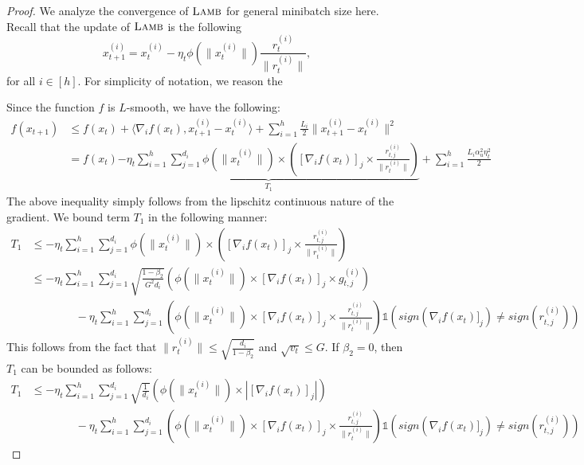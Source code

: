 \begin{proof}
We analyze the convergence of $\textsc{Lamb}$ for general minibatch size here. Recall that the update of $\textsc{Lamb}$  is the following
$$
x_{t+1}^{(i)}  = x_{t}^{(i)} - \eta_t \phi(\|x_t^{(i)}\|) \frac{r_{t}^{(i)}}{\|r_t^{(i)}\|},
$$
for all $i \in [h]$. For simplicity of notation, we reason the 

Since the function $f$ is $L$-smooth, we have the following:
\begin{align}
f(x_{t+1}) &\leq f(x_t) + \langle \nabla_i f(x_t), x_{t+1}^{(i)} - x_{t}^{(i)} \rangle + \sum_{i=1}^h \frac{L_i}{2} \|x_{t+1}^{(i)} - x_t^{(i)}\|^2 \nonumber \\
&= f(x_t) \underbrace{- \eta_t  \sum_{i=1}^h \sum_{j=1}^{d_i} \phi(\|x_t^{(i)}\|)  \times \left( [\nabla_i f(x_t)]_j \times \frac{r_{t,j}^{(i)}}{\|r_{t}^{(i)}\|}  \right)}_{T_1} + \sum_{i=1}^h \frac{L_i \alpha_u^2 \eta_t^2}{2}
\label{eq:lamb-conv-eq1}
\end{align}
The above inequality simply follows from the lipschitz continuous nature of the gradient. We bound term $T_1$ in the following manner:
\begin{align}
T_1  &\leq - \eta_t  \sum_{i=1}^h \sum_{j=1}^{d_i} \phi(\|x_t^{(i)}\|) \times \left( [\nabla_i f(x_t)]_j \times \frac{r_{t,j}^{(i)}}{\|r_{t}^{(i)}\|}  \right) \nonumber \\
&\leq - \eta_t \sum_{i=1}^h \sum_{j=1}^{d_i} \sqrt{\frac{1 - \beta_2}{G^2d_i}} \left( \phi(\|x_t^{(i)}\|)  \times [\nabla_i f(x_t)]_j \times g_{t,j}^{(i)}  \right) \nonumber \\
&\qquad \qquad - \eta_t \sum_{i=1}^h \sum_{j=1}^{d_i} \left(\phi(\|x_t^{(i)}\|)  \times [\nabla_i f(x_t)]_j \times \frac{r_{t,j}^{(i)}}{\|r_{t}^{(i)}\|}  \right)\mathds{1}(sign(\nabla_i f(x_t)]_j) \neq sign(r_{t,j}^{(i)})) 
\label{eq:lamb-conv-eq2}
\end{align}
This follows from the fact that $\|r_{t}^{(i)}\| \leq \sqrt{\frac{d_i}{1 - \beta_2}}$ and $\sqrt{v_t} \leq G$. If $\beta_2 = 0$, then $T_1$ can be bounded as follows:
\begin{align*}
T_1 &\leq - \eta_t \sum_{i=1}^h \sum_{j=1}^{d_i} \sqrt{\frac{1}{d_i}} \left( \phi(\|x_t^{(i)}\|)  \times |[\nabla_i f(x_t)]_j| \right) \nonumber \\
&\qquad \qquad - \eta_t \sum_{i=1}^h \sum_{j=1}^{d_i} \left(\phi(\|x_t^{(i)}\|)  \times [\nabla_i f(x_t)]_j \times \frac{r_{t,j}^{(i)}}{\|r_{t}^{(i)}\|}  \right)\mathds{1}(sign(\nabla_i f(x_t)]_j) \neq sign(r_{t,j}^{(i)})) 
\end{align*}

\end{proof}
